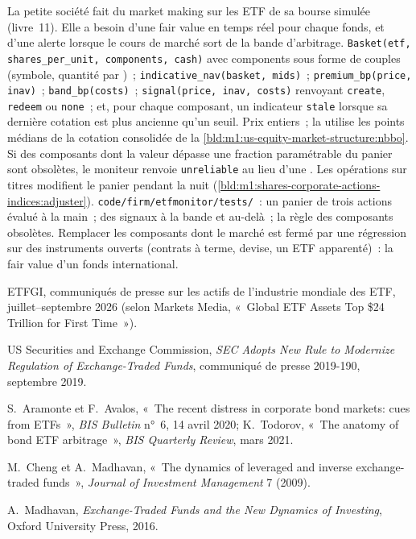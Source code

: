 \begin{build}
 La petite société fait du market making sur les ETF de sa bourse simulée
(livre~11). Elle a besoin d'une fair value en temps réel pour chaque fonds, et
d'une alerte lorsque le cours de marché sort de la bande d'arbitrage.
 \texttt{Basket(etf, shares\_per\_unit, components, cash)}
avec components sous forme de couples (symbole, quantité par )~;
\texttt{indicative\_nav(basket, mids)}~; \texttt{premium\_bp(price, inav)}~;
\texttt{band\_bp(costs)}~; \texttt{signal(price, inav, costs)} renvoyant
\texttt{create}, \texttt{redeem} ou \texttt{none}~; et, pour chaque composant, un indicateur
\texttt{stale} lorsque sa dernière cotation est plus ancienne qu'un seuil.
 Prix entiers~; la  utilise les points médians de
la cotation consolidée de la \cref{bld:m1:us-equity-market-structure:nbbo}. Si des composants dont la
valeur dépasse une fraction paramétrable du panier sont obsolètes,
le moniteur renvoie \texttt{unreliable} au lieu d'une . Les opérations sur titres
modifient le panier pendant la nuit
(\cref{bld:m1:shares-corporate-actions-indices:adjuster}).
 \texttt{code/firm/etfmonitor/tests/}~: un panier de trois actions évalué
à la main~; des signaux à la bande et au-delà~; la règle des composants
obsolètes.
 Remplacer les composants dont le marché est fermé par une régression sur
des instruments ouverts (contrats à terme, devise, un ETF apparenté)~: la fair value
d'un fonds international.
\end{build}

\begin{omsources}
\item ETFGI, communiqués de presse sur les actifs de l'industrie mondiale des ETF, juillet--septembre
2026 (selon Markets Media, «~Global ETF Assets Top \$24 Trillion for
First Time~»).
\item US Securities and Exchange Commission, \emph{SEC Adopts New Rule to
Modernize Regulation of Exchange-Traded Funds}, communiqué de presse 2019-190, septembre 2019.
\item S.~Aramonte et F.~Avalos, «~The recent distress in corporate bond
markets: cues from ETFs~», \emph{BIS Bulletin} n°~6, 14 avril 2020; K.~Todorov,
«~The anatomy of bond ETF arbitrage~», \emph{BIS Quarterly Review}, mars
2021.
\item M.~Cheng et A.~Madhavan, «~The dynamics of leveraged and inverse
exchange-traded funds~», \emph{Journal of Investment Management} 7 (2009).
\item A.~Madhavan, \emph{Exchange-Traded Funds and the New Dynamics of
Investing}, Oxford University Press, 2016.
\end{omsources}

